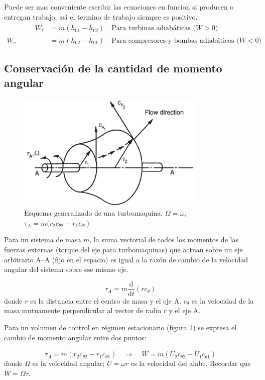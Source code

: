 \documentclass{article}
\newcommand{\ctan}[1]{\ensuremath{c_{\theta #1}}}
\newcommand{\angvel}{\ensuremath{\omega}}
\newcommand{\di}{\textrm{d}}
\newcommand{\dW}{\dot{W}}
\newcommand{\dm}{\dot{m}}
\begin{document}
Puede ser mas conveniente escribir las ecuaciones en funcion si producen o entregan trabajo, asi el termino de trabajo siempre es positivo.
\begin{align*}
        \qquad \qquad \dW_t &= \dm (h_{01}-h_{02}) \quad \text{Para turbinas adiabáticas ($\dW>0$)} \\
        \dW_c &= \dm (h_{02}-h_{01}) \quad \text{Para compresores y bombas adiabáticos ($\dW<0$)} 
\end{align*}

\subsection{Conservación de la cantidad de momento angular}


\begin{figure}[ht!]
    \centering
    \includegraphics[width=9cm]{fig/turb.png}
    \caption{Esquema generalizado de una turbomaquina. $\Omega=\angvel,\quad$      $\tau_A=\dot{m}(r_2 \ctan{2} -r_1 \ctan{1}$)}
    \label{fig:turbina}
\end{figure}
Para un sistema de masa $m$, la suma vectorial de todos los momentos de las fuerzas externas (torque del eje para turbomaquinas) que actuan sobre un eje arbitrario A--A (fijo en el espacio) es igual  a la razón de cambio de la velocidad angular del sistema sobre ese mismo eje.

\[
\tau_{A} = m \frac{\di}{\di t} (r \ctan{})
\]
donde $r$ es la distancia entre el centro de masa y el eje A. $\ctan{}$ es la velocidad de la masa mutuamente perpendicular al vector de radio $r$ y el eje A. 

Para un volumen de control en régimen estacionario (figura \ref{fig:turbina}) se expresa el cambio de momento angular entre dos puntos:

\begin{equation}\label{eq:eulerparaTubomaquinas}
    \tau_{A}= \dot{m} (r_2\ctan{2} -r_1 \ctan{1})  \quad \Rightarrow\quad \dW =\dm (U_2 \ctan{2}- U_1 \ctan{1})  
\end{equation}
donde $\Omega$ es la velocidad angular; $U=\omega r$ es la velocidad del alabe. Recordar que $\dW = \Omega \tau$.
\end{document}
